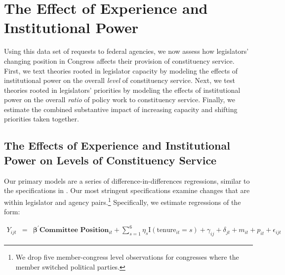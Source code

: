 \documentclass[12pt]{article}
\begin{document}
\section{The Effect of Experience and Institutional Power}\label{s:results} 

Using this data set of requests to federal agencies, we now assess how legislators' changing position in Congress affects their provision of constituency service. First, we text theories rooted in legislator capacity by modeling the effects of institutional power on the overall \textit{level} of constituency service. Next, we test theories rooted in legislators' priorities by modeling the effects of institutional power on the overall \textit{ratio} of policy work to constituency service. Finally, we estimate the combined substantive impact of increasing capacity and shifting priorities taken together. 

\subsection{The Effects of Experience and Institutional Power on Levels of Constituency Service}\label{s:prestige}

 Our primary models are a series of difference-in-differences regressions, similar to the specifications in \cite{BerryFowler2016}. Our most stringent specifications examine changes that are within legislator and agency pairs.\footnote{We drop five member-congress level observations for congresses where the member switched political parties.} Specifically, we estimate regressions of the form: 

\begin{eqnarray}
Y_{ijt} & = & \boldsymbol{\beta}^{'} \textbf{Committee Position}_{it}  + \sum_{s = 1}^{6} \eta_{s} \text{I}\left(\text{tenure}_{it} = s\right) + \gamma_{ij} + \delta_{jt} + m_{it} + p_{it} + \epsilon_{ijt} \label{e:diff1}
\end{eqnarray}
\end{document}
